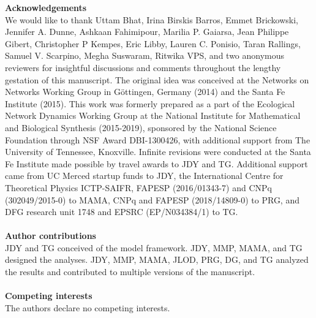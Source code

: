 \documentclass[twocolumn,preprintnumbers,amsmath,amssymb,superscriptaddress,linenumbers]{revtex4-1}
\begin{document}
\vspace{2mm}
\noindent \textbf{Acknowledgements}\\
  \footnotesize{
  We would like to thank
  Uttam Bhat,
  Irina Birskis Barros,
  Emmet Brickowski,
  Jennifer A. Dunne,
  Ashkaan Fahimipour,
  Marilia P. Gaiarsa,
  Jean Philippe Gibert,
  Christopher P Kempes,
  Eric Libby,
  Lauren C. Ponisio,
  Taran Rallings,
  Samuel V. Scarpino,
  Megha Suswaram,
  Ritwika VPS,
  and two anonymous reviewers
  for insightful discussions and comments throughout the lengthy gestation of this manuscript.
  The original idea was conceived at the Networks on Networks Working Group in G\"ottingen, Germany (2014) and the Santa Fe Institute (2015).
  This work was formerly prepared as a part of the Ecological Network Dynamics Working Group at the National Institute for Mathematical and Biological Synthesis (2015-2019), sponsored by the National Science Foundation through NSF Award DBI-1300426, with additional support from The University of Tennessee, Knoxville.
  Infinite revisions were conducted at the Santa Fe Institute made possible by travel awards to JDY and TG.
  Additional support came from UC Merced startup funds to JDY, the International Centre for Theoretical Physics ICTP-SAIFR, FAPESP (2016/01343-7) and CNPq (302049/2015-0) to MAMA, CNPq and FAPESP (2018/14809-0) to PRG, and DFG research unit 1748 and EPSRC (EP/N034384/1) to TG.
  }\\ \\
  
\noindent \textbf{Author contributions}\\
  \footnotesize{
  JDY and TG conceived of the model framework. JDY, MMP, MAMA, and TG designed the analyses. JDY, MMP, MAMA, JLOD, PRG, DG, and TG analyzed the results and contributed to multiple versions of the manuscript.
  }\\ \\
\noindent \textbf{Competing interests}\\
  \footnotesize{
  The authors declare no competing interests.
  }
\clearpage

\clearpage
\end{document}
